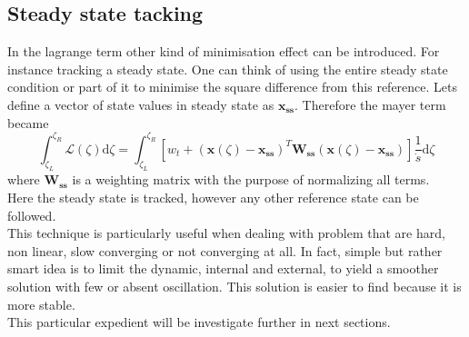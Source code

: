 \subsection{Steady state tacking}
%
In the lagrange term other kind of minimisation effect can be introduced. For instance tracking a steady state. One can think of using the entire steady state condition or part of it to minimise the square difference from this reference. Lets define a vector of state values in steady state as $\mathbf{x_{ss}}$. Therefore the mayer term became
%
\begin{equation}
    \int_{\zeta_L}^{\zeta_R} \mathcal{L}(\zeta)\mathrm{d}\zeta = \int_{\zeta_L}^{\zeta_R} [ w_t + (\mathbf{x}(\zeta)-\mathbf{x_{ss}})^T \mathbf{W_{ss}}  (\mathbf{x}(\zeta)-\mathbf{x_{ss}})  ] \frac{1}{\dot{s}} \mathrm{d}\zeta  
\end{equation}
%
where $\mathbf{W_{ss}}$ is a weighting matrix with the purpose of normalizing all terms.\\
Here the steady state is tracked, however any other reference state can be followed.\\
This technique is particularly useful when dealing with problem that are hard, non linear, slow converging or not converging at all. In fact, simple but rather smart idea is to limit the dynamic, internal and external, to yield a smoother solution with few or absent oscillation. This solution is easier to find because it is more stable.\\
This particular expedient will be investigate further in next sections.
%